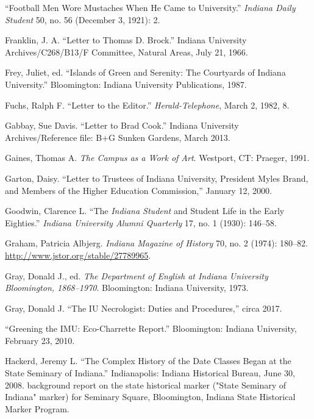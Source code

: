 \documentclass[
  american,
  letterpaper,
]{scrreprt}
\newlength{\cslhangindent}
\newenvironment{CSLReferences}[2] %
 {\begin{list}{}{%
  \setlength{\itemindent}{0pt}
  \setlength{\leftmargin}{0pt}
  \setlength{\parsep}{0pt}
  \ifodd #1
   \setlength{\leftmargin}{\cslhangindent}
   \setlength{\itemindent}{-1\cslhangindent}
  \fi
  \setlength{\itemsep}{#2\baselineskip}}}
 {\end{list}}
\begin{document}
\begin{CSLReferences}{1}{0}
{``Football Men Wore Mustaches When He Came to University.''}
\emph{Indiana Daily Student} 50, no. 56 (December 3, 1921): 2.

Franklin, J. A. {``Letter to Thomas {D}. Brock.''} Indiana University
Archives/C268/B13/F Committee, Natural Areas, July 21, 1966.

Frey, Juliet, ed. {``Islands of Green and Serenity: The Courtyards of
Indiana University.''} Bloomington: Indiana University Publications,
1987.

Fuchs, Ralph F. {``Letter to the Editor.''} \emph{Herald-Telephone},
March 2, 1982, 8.

Gabbay, Sue Davis. {``Letter to Brad Cook.''} Indiana University
Archives/Reference file: B+G Sunken Gardens, March 2013.

Gaines, Thomas A. \emph{The Campus as a Work of Art}. Westport, CT:
Praeger, 1991.

Garton, Daisy. {``Letter to Trustees of Indiana University, President
Myles Brand, and Members of the Higher Education Commission,''} January
12, 2000.

Goodwin, Clarence L. {``The \emph{Indiana Student} and Student Life in
the Early Eighties.''} \emph{Indiana University Alumni Quarterly} 17,
no. 1 (1930): 146--58.

Graham, Patricia Albjerg. \emph{Indiana Magazine of History} 70, no. 2
(1974): 180--82. \url{http://www.jstor.org/stable/27789965}.

Gray, Donald J., ed. \emph{The Department of English at Indiana
University Bloomington, 1868--1970}. Bloomington: Indiana University,
1973.

Gray, Donald J. {``The IU Necrologist: Duties and Procedures,''} circa
2017.

{``Greening the IMU: Eco-Charrette Report.''} Bloomington: Indiana
University, February 23, 2010.

Hackerd, Jeremy L. {``The Complex History of the Date Classes Began at
the State Seminary of Indiana.''} Indianapolis: Indiana Historical
Bureau, June 30, 2008. background report on the state historical marker
("State Seminary of Indiana" marker) for Seminary Square, Bloomington,
Indiana State Historical Marker Program.


\end{CSLReferences}
\end{document}
